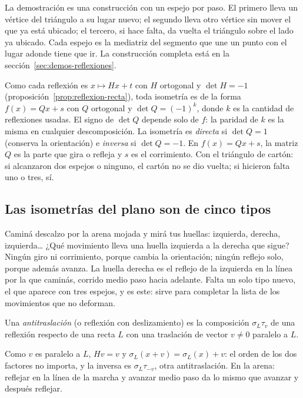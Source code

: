 La demostración es una construcción con un espejo por paso. El primero lleva un vértice del
triángulo a su lugar nuevo; el segundo lleva otro vértice sin mover el que ya está ubicado; el
tercero, si hace falta, da vuelta el triángulo sobre el lado ya ubicado. Cada espejo es la
mediatriz del segmento que une un punto con el lugar adonde tiene que ir. La construcción
completa está en la sección~\ref{sec:demos-reflexiones}.

Como cada reflexión es \(x\mapsto Hx+t\) con \(H\) ortogonal y \(\det H=-1\)
(proposición~\ref{prop:reflexion-recta}), toda isometría es de la forma \(f(x)=Qx+s\) con \(Q\)
ortogonal y \(\det Q=(-1)^k\), donde \(k\) es la cantidad de reflexiones usadas. El signo de
\(\det Q\) depende solo de \(f\): la paridad de \(k\) es la misma en cualquier descomposición.
La isometría es \emph{directa} si \(\det Q=1\) (conserva la orientación) e \emph{inversa} si
\(\det Q=-1\).
En \(f(x)=Qx+s\), la matriz \(Q\) es la parte que gira o refleja y \(s\) es el corrimiento.
Con el triángulo de cartón: si alcanzaron dos espejos o ninguno, el cartón no se dio vuelta; si
hicieron falta uno o tres, sí.

\subsection{Las isometrías del plano son de cinco tipos}\label{sec:cinco-tipos}

Caminá descalzo por la arena mojada y mirá tus huellas: izquierda, derecha, izquierda… ¿Qué
movimiento lleva una huella izquierda a la derecha que sigue? Ningún giro ni corrimiento, porque
cambia la orientación; ningún reflejo solo, porque además avanza. La huella derecha es el
reflejo de la izquierda en la línea por la que caminás, corrido medio paso hacia adelante.
Falta un solo tipo nuevo, el que aparece con tres espejos, y es este: sirve para completar la
lista de los movimientos que no deforman.

\begin{definicion}[Antitraslación]\label{def:antitraslacion}
Una \emph{antitraslación} (o reflexión con deslizamiento) es la composición
\(\sigma_{L}\tau_v\) de una reflexión respecto de una recta \(L\) con una traslación de vector
\(v\neq0\) paralelo a \(L\).
\end{definicion}

Como \(v\) es paralelo a \(L\), \(Hv=v\) y \(\sigma_{L}(x+v)=\sigma_{L}(x)+v\): el orden de los dos
factores no importa, y la inversa es \(\sigma_{L}\tau_{-v}\), otra antitraslación.
En la arena: reflejar en la línea de la marcha y avanzar medio paso da lo mismo que avanzar y
después reflejar.

